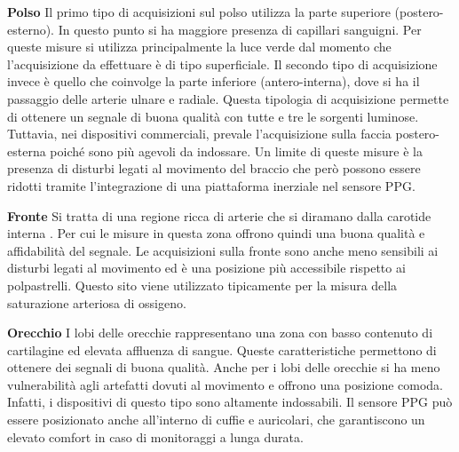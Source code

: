 \textbf{Polso}  Il primo tipo di acquisizioni sul polso utilizza la parte superiore (postero-esterno). In questo punto si ha maggiore presenza di capillari sanguigni. Per queste misure si utilizza principalmente la luce verde dal momento che l'acquisizione da effettuare è di tipo superficiale.	 Il secondo tipo di acquisizione invece è quello che coinvolge la parte inferiore (antero-interna), dove si ha il passaggio delle arterie ulnare e radiale. Questa tipologia di acquisizione permette di ottenere un segnale di buona qualità con tutte e tre le sorgenti luminose. Tuttavia, nei dispositivi commerciali, prevale l'acquisizione sulla faccia postero-esterna poiché sono più agevoli da indossare. Un limite di queste misure è la presenza di disturbi legati al movimento del braccio che però possono essere ridotti tramite l'integrazione di una piattaforma inerziale nel sensore PPG\cite{Ghamari2018}.

\textbf{Fronte} Si tratta di una regione ricca di arterie che si diramano dalla carotide interna \cite{Abay2019}. Per cui le misure in questa zona offrono quindi una buona qualità e affidabilità del segnale. Le acquisizioni sulla fronte sono anche meno sensibili ai disturbi legati al movimento ed è una posizione più accessibile rispetto ai polpastrelli. Questo sito viene utilizzato tipicamente per la misura della saturazione arteriosa di ossigeno.

\textbf{Orecchio} I lobi delle orecchie rappresentano una zona con basso contenuto di cartilagine ed elevata affluenza di sangue. Queste caratteristiche permettono di ottenere dei segnali di buona qualità. Anche per i lobi delle orecchie si ha meno vulnerabilità agli artefatti dovuti al movimento e offrono una posizione comoda. Infatti, i dispositivi di questo tipo sono altamente indossabili\cite{Ghamari2018}. Il sensore PPG può essere posizionato anche all'interno di cuffie e auricolari, che garantiscono un elevato comfort in caso di monitoraggi a lunga durata.

 